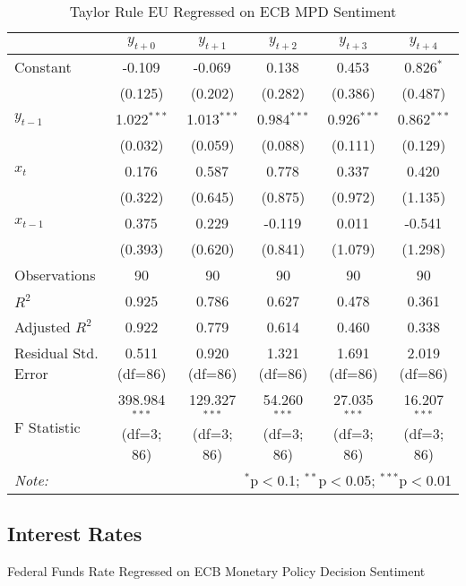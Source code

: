 \documentclass [12pt]{article}
\begin{document}
\begin{table}[H] \centering
  \caption{Taylor Rule EU Regressed on ECB MPD Sentiment}
  \begin{adjustbox}{width=\textwidth}
\begin{tabular}{lccccc}
\hline
\hline
 & $y_{t+0}$ & $y_{t+1}$ & $y_{t+2}$ & $y_{t+3}$ & $y_{t+4}$  \\
\hline
 Constant & -0.109$^{}$ & -0.069$^{}$ & 0.138$^{}$ & 0.453$^{}$ & 0.826$^{*}$ \\
& (0.125) & (0.202) & (0.282) & (0.386) & (0.487) \\
 $y_{t-1}$ & 1.022$^{***}$ & 1.013$^{***}$ & 0.984$^{***}$ & 0.926$^{***}$ & 0.862$^{***}$ \\
& (0.032) & (0.059) & (0.088) & (0.111) & (0.129) \\
 $x_{t}$ & 0.176$^{}$ & 0.587$^{}$ & 0.778$^{}$ & 0.337$^{}$ & 0.420$^{}$ \\
& (0.322) & (0.645) & (0.875) & (0.972) & (1.135) \\
 $x_{t-1}$ & 0.375$^{}$ & 0.229$^{}$ & -0.119$^{}$ & 0.011$^{}$ & -0.541$^{}$ \\
& (0.393) & (0.620) & (0.841) & (1.079) & (1.298) \\
\hline
 Observations & 90 & 90 & 90 & 90 & 90 \\
 $R^2$ & 0.925 & 0.786 & 0.627 & 0.478 & 0.361 \\
 Adjusted $R^2$ & 0.922 & 0.779 & 0.614 & 0.460 & 0.338 \\
 Residual Std. Error & 0.511 (df=86) & 0.920 (df=86) & 1.321 (df=86) & 1.691 (df=86) & 2.019 (df=86) \\
 F Statistic & 398.984$^{***}$ (df=3; 86) & 129.327$^{***}$ (df=3; 86) & 54.260$^{***}$ (df=3; 86) & 27.035$^{***}$ (df=3; 86) & 16.207$^{***}$ (df=3; 86) \\
\hline
\hline
\textit{Note:} & \multicolumn{5}{r}{$^{*}$p$<$0.1; $^{**}$p$<$0.05; $^{***}$p$<$0.01} \\
\end{tabular}
\end{adjustbox}
\end{table}

\subsection{Interest Rates}

Federal Funds Rate Regressed on ECB Monetary Policy Decision Sentiment
\end{document}
